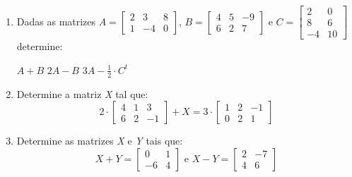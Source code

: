 \begin{multicols}{2}
	\begin{enumerate}[label*=\protect\fbox{\arabic{enumi}}]
		\item {
		      Dadas as matrizes $A = \begin{bmatrix}
				      2 & 3  & 8 \\
				      1 & -4 & 0
			      \end{bmatrix}$, $B = \begin{bmatrix}
				      4 & 5 & -9 \\
				      6 & 2 & 7
			      \end{bmatrix}$ e $C = \begin{bmatrix}
				      2  & 0  \\
				      8  & 6  \\
				      -4 & 10
			      \end{bmatrix}$ determine:
		      \begin{tasks}
			      \task $A + B$
			      \task $2A - B$
			      \task $3A - \frac{1}{2}\cdot C^t$
		      \end{tasks}
		      }

		\item {
		      Determine a matriz \textit{X} tal que:
		      \begin{equation*}
			      2 \cdot \begin{bmatrix}
				      4 & 1 & 3  \\
				      6 & 2 & -1
			      \end{bmatrix} + X = 3 \cdot \begin{bmatrix}
				      1 & 2 & -1 \\
				      0 & 2 & 1
			      \end{bmatrix}
		      \end{equation*}
		      }

		\item {
		      Determine as matrizes \textit{X} e \textit{Y} tais que:
		      \begin{equation*}
			      X + Y = \begin{bmatrix}
				      0  & 1 \\
				      -6 & 4
			      \end{bmatrix} \text{ e } X - Y = \begin{bmatrix}
				      2 & -7 \\
				      4 & 6
			      \end{bmatrix}
		      \end{equation*}
		      }
	\end{enumerate}
\end{multicols}

